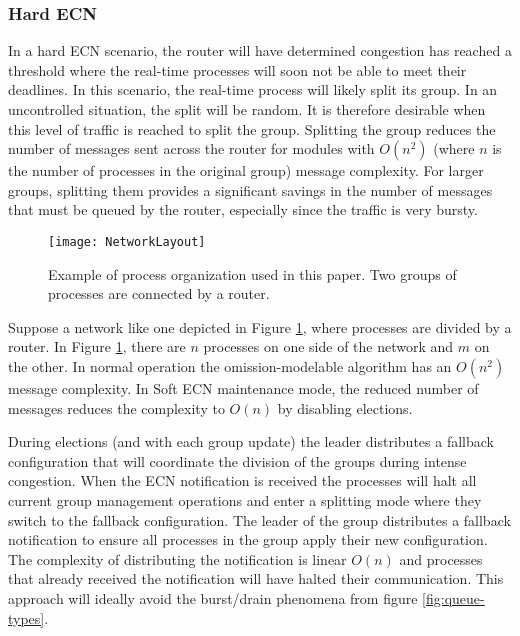 \subsubsection{Hard \ac{ECN}}

In a hard \ac{ECN} scenario, the router will have determined congestion has reached a threshold where the real-time processes will soon not be able to meet their deadlines.
In this scenario, the real-time process will likely split its group.
In an uncontrolled situation, the split will be random.
It is therefore desirable when this level of traffic is reached to split the group.
Splitting the group reduces the number of messages sent across the router for modules with $O(n^2)$ (where $n$ is the number of processes in the original group) message complexity.
For larger groups, splitting them provides a significant savings in the number of messages that must be queued by the router, especially since the traffic is very bursty.

\begin{figure}
\centering
\texttt{[image: NetworkLayout]}
\caption{Example of process organization used in this paper. Two groups of processes are connected by a router.} \label{fig:network-layout}
\end{figure}

Suppose a network like one depicted in Figure \ref{fig:network-layout}, where processes are divided by a router.
In Figure \ref{fig:network-layout}, there are $n$ processes on one side of the network and $m$ on the other.
In normal operation the omission-modelable algorithm has an $O(n^2)$ message complexity.
In Soft \ac{ECN} maintenance mode, the reduced number of messages reduces the complexity to $O(n)$ by disabling elections.

During elections (and with each group update) the leader distributes a fallback configuration that will coordinate the division of the groups during intense congestion.
When the \ac{ECN} notification is received the processes will halt all current group management operations and enter a splitting mode where they switch to the fallback configuration.
The leader of the group distributes a fallback notification to ensure all processes in the group apply their new configuration. 
The complexity of distributing the notification is linear $O(n)$ and processes that already received the notification will have halted their communication.
This approach will ideally avoid the burst/drain phenomena from figure \ref{fig:queue-types}.

